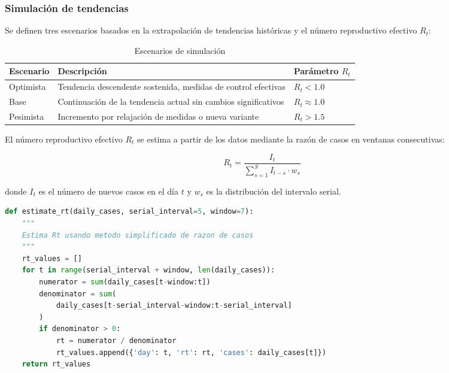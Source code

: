 \documentclass[12pt,a4paper]{article}
\begin{document}
\subsubsection{Simulación de tendencias}\label{simulaciuxf3n-de-tendencias}

Se definen tres escenarios basados en la extrapolación de tendencias históricas y el número reproductivo efectivo $R_t$:

\begin{table}[H]
    \centering
    \caption{Escenarios de simulación}
    \begin{tabular}{@{}lp{8cm}l@{}}
        \toprule
        \textbf{Escenario} & \textbf{Descripción}                                           & \textbf{Parámetro $R_t$} \\
        \midrule
        Optimista          & Tendencia descendente sostenida, medidas de control efectivas  & $R_t < 1.0$              \\
        Base               & Continuación de la tendencia actual sin cambios significativos & $R_t \approx 1.0$        \\
        Pesimista          & Incremento por relajación de medidas o nueva variante          & $R_t > 1.5$              \\
        \bottomrule
    \end{tabular}
\end{table}

El número reproductivo efectivo $R_t$ se estima a partir de los datos mediante la razón de casos en ventanas consecutivas:

\[
    R_t = \frac{I_t}{\sum_{s=1}^{S} I_{t-s} \cdot w_s}
\]

donde $I_t$ es el número de nuevos casos en el día $t$ y $w_s$ es la distribución del intervalo serial.

\begin{lstlisting}[language=Python, caption=Estimación de $R_t$ a partir de datos históricos]
def estimate_rt(daily_cases, serial_interval=5, window=7):
    """
    Estima Rt usando metodo simplificado de razon de casos
    """
    rt_values = []
    for t in range(serial_interval + window, len(daily_cases)):
        numerator = sum(daily_cases[t-window:t])
        denominator = sum(
            daily_cases[t-serial_interval-window:t-serial_interval]
        )
        if denominator > 0:
            rt = numerator / denominator
            rt_values.append({'day': t, 'rt': rt, 'cases': daily_cases[t]})
    return rt_values
\end{lstlisting}
\end{document}
